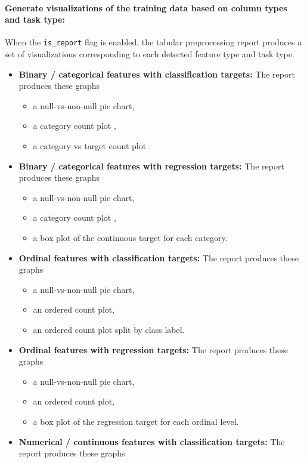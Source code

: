 \paragraph{Generate visualizations of the training data based on column types and task type:}\par
When the \texttt{is\_report} flag is enabled, the tabular preprocessing report produces a set of visualizations corresponding to each detected feature type and task type.
\begin{itemize}
  \item \textbf{Binary / categorical features with classification targets:} The report produces these graphs
    \begin{itemize}
      \item a null-vs-non-null pie chart,
      \item a category count plot ,
      \item a category vs target count plot .
    \end{itemize}
  \item \textbf{Binary / categorical features with regression targets:} The report produces these graphs
    \begin{itemize}
      \item a null-vs-non-null pie chart,
      \item a category count plot ,
      \item a box plot of the continuous target for each category.
    \end{itemize}
  \item \textbf{Ordinal features with classification targets:} The report produces these graphs
    \begin{itemize}
      \item a null-vs-non-null pie chart,
      \item an ordered count plot,
      \item an ordered count plot split by class label.
    \end{itemize}
  \item \textbf{Ordinal features with regression targets:} The report  produces these graphs
    \begin{itemize}
      \item a null-vs-non-null pie chart,
      \item an ordered count plot,
      \item a box plot of the regression target for each ordinal level.
    \end{itemize}
  \item \textbf{Numerical / continuous features with classification targets:} The report  produces these graphs

\end{itemize}
